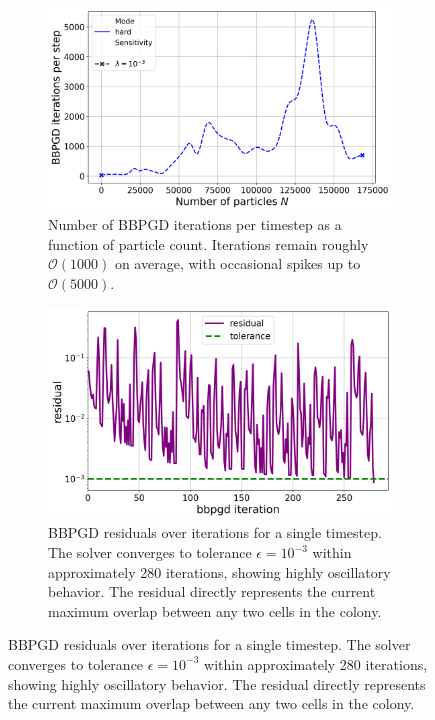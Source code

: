 \documentclass[conference]{IEEEtran}
\begin{document}
\newpage

\begin{figure}[H]
    \centering
    \begin{subfigure}[b]{\linewidth}
        \centering
        \includegraphics[width=\linewidth]{figures/bbpgd/bbpgd_num_particles_vs_bbpgd_steps.png}
        \caption{Number of BBPGD iterations per timestep as a function of particle count. Iterations remain roughly $\mathcal{O}(1000)$ on average, with occasional spikes up to $\mathcal{O}(5000)$.}
        \label{fig:bbpgd_iterations_per_step_vs_num_particles}
    \end{subfigure}

    \begin{subfigure}[b]{\linewidth}
        \centering
        \includegraphics[width=\linewidth]{figures/bbpgd/bbpgd_residual.png}
        \caption{BBPGD residuals over iterations for a single timestep. The solver converges to tolerance $\epsilon = 10^{-3}$ within approximately 280 iterations, showing highly oscillatory behavior. The residual directly represents the current maximum overlap between any two cells in the colony.}
        \label{fig:bbpgd_residual}
    \end{subfigure}


\end{figure}
\end{document}
